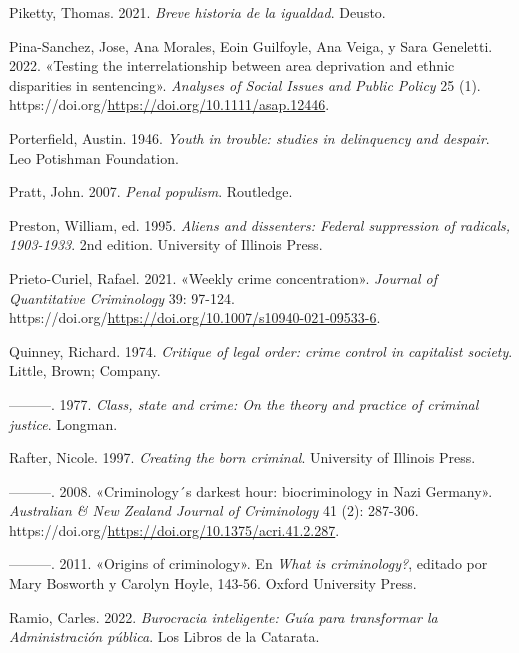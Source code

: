 \documentclass[
  spanish,
  letterpaper,
  DIV=11,
  numbers=noendperiod]{scrreprt}
\newlength{\cslhangindent}
\newenvironment{CSLReferences}[2] %
 {\begin{list}{}{%
  \setlength{\itemindent}{0pt}
  \setlength{\leftmargin}{0pt}
  \setlength{\parsep}{0pt}
  \ifodd #1
   \setlength{\leftmargin}{\cslhangindent}
   \setlength{\itemindent}{-1\cslhangindent}
  \fi
  \setlength{\itemsep}{#2\baselineskip}}}
 {\end{list}}
\begin{document}
\begin{CSLReferences}{1}{0}
Piketty, Thomas. 2021. \emph{Breve historia de la igualdad}. Deusto.

Pina-Sanchez, Jose, Ana Morales, Eoin Guilfoyle, Ana Veiga, y Sara
Geneletti. 2022. {«Testing the interrelationship between area
deprivation and ethnic disparities in sentencing»}. \emph{Analyses of
Social Issues and Public Policy} 25 (1).
https://doi.org/\url{https://doi.org/10.1111/asap.12446}.

Porterfield, Austin. 1946. \emph{Youth in trouble: studies in
delinquency and despair}. Leo Potishman Foundation.

Pratt, John. 2007. \emph{Penal populism}. Routledge.

Preston, William, ed. 1995. \emph{Aliens and dissenters: Federal
suppression of radicals, 1903-1933}. 2nd edition. University of Illinois
Press.

Prieto-Curiel, Rafael. 2021. {«Weekly crime concentration»}.
\emph{Journal of Quantitative Criminology} 39: 97-124.
https://doi.org/\url{https://doi.org/10.1007/s10940-021-09533-6}.

Quinney, Richard. 1974. \emph{Critique of legal order: crime control in
capitalist society}. Little, Brown; Company.

---------. 1977. \emph{Class, state and crime: On the theory and
practice of criminal justice}. Longman.

Rafter, Nicole. 1997. \emph{Creating the born criminal}. University of
Illinois Press.

---------. 2008. {«Criminology´s darkest hour: biocriminology in Nazi
Germany»}. \emph{Australian \& New Zealand Journal of Criminology} 41
(2): 287-306.
https://doi.org/\url{https://doi.org/10.1375/acri.41.2.287}.

---------. 2011. {«Origins of criminology»}. En \emph{What is
criminology?}, editado por Mary Bosworth y Carolyn Hoyle, 143-56. Oxford
University Press.

Ramio, Carles. 2022. \emph{Burocracia inteligente: Guía para transformar
la Administración pública}. Los Libros de la Catarata.


\end{CSLReferences}
\end{document}
